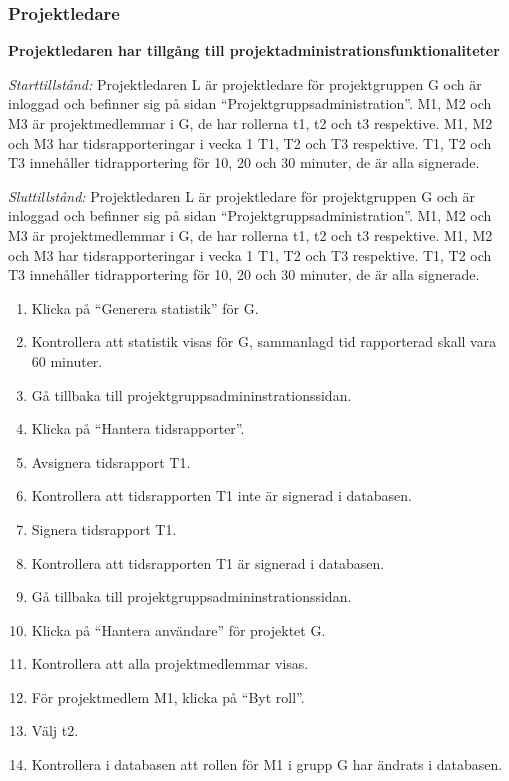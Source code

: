 \documentclass[a4paper]{article}
\begin{document}
\subsubsection{Projektledare}
\begin{ST}
\item \textbf{Projektledaren har tillgång till projektadministrationsfunktionaliteter}

\emph{Starttillstånd:} Projektledaren L är projektledare för projektgruppen G och är inloggad och befinner sig på sidan ``Projektgruppsadministration''. M1, M2 och M3 är projektmedlemmar i G, de har rollerna t1, t2 och t3 respektive. M1, M2 och M3 har tidsrapporteringar i vecka 1 T1, T2 och T3 respektive. T1, T2 och T3 innehåller tidrapportering för 10, 20 och 30 minuter, de är alla signerade.

\emph{Sluttillstånd:} Projektledaren L är projektledare för projektgruppen G och är inloggad och befinner sig på sidan ``Projektgruppsadministration''. M1, M2 och M3 är projektmedlemmar i G, de har rollerna t1, t2 och t3 respektive. M1, M2 och M3 har tidsrapporteringar i vecka 1 T1, T2 och T3 respektive. T1, T2 och T3 innehåller tidrapportering för 10, 20 och 30 minuter, de är alla signerade.

\begin{enumerate}
\item Klicka på ``Generera statistik'' för G.
\item Kontrollera att statistik visas för G, sammanlagd tid rapporterad skall vara 60 minuter.
\item Gå tillbaka till projektgruppsadmininstrationssidan.
\item Klicka på ``Hantera tidsrapporter''.
\item Avsignera tidsrapport T1.
\item Kontrollera att tidsrapporten T1 inte är signerad i databasen.
\item Signera tidsrapport T1.
\item Kontrollera att tidsrapporten T1 är signerad i databasen.
\item Gå tillbaka till projektgruppsadmininstrationssidan.
\item Klicka på ``Hantera användare'' för projektet G.
\item Kontrollera att alla projektmedlemmar visas.
\item För projektmedlem M1, klicka på ``Byt roll''.
\item Välj t2.
\item Kontrollera i databasen att rollen för M1 i grupp G har ändrats i databasen.
\end{enumerate}
\end{ST}
\end{document}
